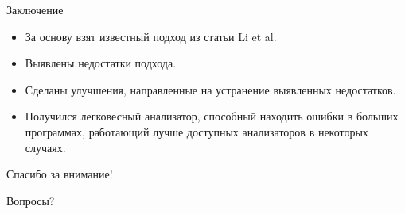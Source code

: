 \documentclass[russian, hyperref={unicode}]{beamer}
\begin{document}
\begin{frame}{Заключение}
    \begin{itemize}
        \item За основу взят известный подход из статьи Li et al.
        \item Выявлены недостатки подхода.
        \item Сделаны улучшения, направленные на устранение выявленных
          недостатков.
        \item Получился легковесный анализатор, способный находить
          ошибки в больших программах, работающий лучше доступных
          анализаторов в некоторых случаях.
    \end{itemize}
\end{frame}

\begin{frame}{Спасибо за внимание!}
    \begin{center}
        \Huge
        {\color{blue} Вопросы?}
    \end{center}
\end{frame}


\end{document}
